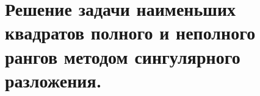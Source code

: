 \section{Решение задачи наименьших квадратов полного и неполного рангов методом сингулярного разложения.}

